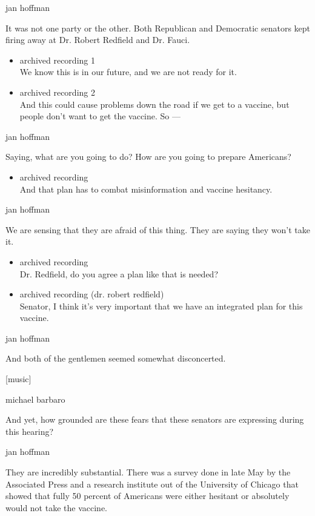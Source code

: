 jan hoffman

It was not one party or the other. Both Republican and Democratic
senators kept firing away at Dr. Robert Redfield and Dr. Fauci.

\begin{itemize}
\item
  archived recording 1\\
  We know this is in our future, and we are not ready for it.
\item
  archived recording 2\\
  And this could cause problems down the road if we get to a vaccine,
  but people don't want to get the vaccine. So ---
\end{itemize}

jan hoffman

Saying, what are you going to do? How are you going to prepare
Americans?

\begin{itemize}
\tightlist
\item
  archived recording\\
  And that plan has to combat misinformation and vaccine hesitancy.
\end{itemize}

jan hoffman

We are sensing that they are afraid of this thing. They are saying they
won't take it.

\begin{itemize}
\item
  archived recording\\
  Dr. Redfield, do you agree a plan like that is needed?
\item
  archived recording (dr. robert redfield)\\
  Senator, I think it's very important that we have an integrated plan
  for this vaccine.
\end{itemize}

jan hoffman

And both of the gentlemen seemed somewhat disconcerted.

{[}music{]}

michael barbaro

And yet, how grounded are these fears that these senators are expressing
during this hearing?

jan hoffman

They are incredibly substantial. There was a survey done in late May by
the Associated Press and a research institute out of the University of
Chicago that showed that fully 50 percent of Americans were either
hesitant or absolutely would not take the vaccine.

